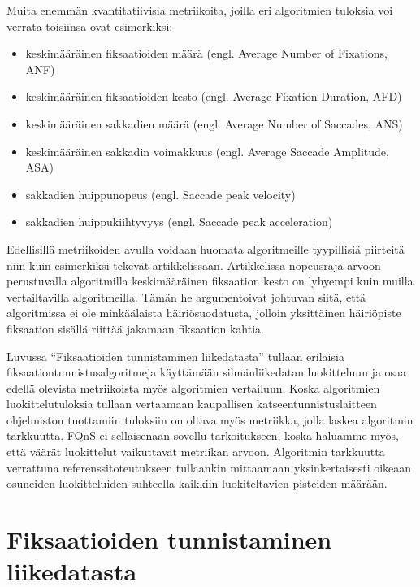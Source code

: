 Muita enemmän kvantitatiivisia metriikoita, joilla eri algoritmien tuloksia voi verrata toisiinsa ovat esimerkiksi:
\begin{itemize}
  \item keskimääräinen fiksaatioiden määrä (engl. Average Number of Fixations, ANF) \citep[s. 4]{komogortsev2010}
  \item keskimääräinen fiksaatioiden kesto (engl. Average Fixation Duration, AFD) \citep[s. 4]{komogortsev2010}
  \item keskimääräinen sakkadien määrä (engl. Average Number of Saccades, ANS) \citep[s. 4]{komogortsev2010}
	\item keskimääräinen sakkadin voimakkuus (engl. Average Saccade Amplitude, ASA) \citep[s. 4]{komogortsev2010}
	\item sakkadien huippunopeus (engl. Saccade peak velocity) \citep[s. 195]{nystrom2010}
	\item sakkadien huippukiihtyvyys (engl. Saccade peak acceleration) \citep[s. 195]{nystrom2010}
	
\end{itemize}

Edellisillä metriikoiden avulla voidaan huomata algoritmeille tyypillisiä piirteitä niin kuin esimerkiksi \citet[s. 195]{nystrom2010} tekevät artikkelissaan. Artikkelissa nopeusraja-arvoon perustuvalla algoritmilla keskimääräinen fiksaation kesto on lyhyempi kuin muilla vertailtavilla algoritmeilla. Tämän he argumentoivat johtuvan siitä, että algoritmissa ei ole minkäälaista häiriösuodatusta, jolloin yksittäinen häiriöpiste fiksaation sisällä riittää jakamaan fiksaation kahtia.

Luvussa ``Fiksaatioiden tunnistaminen liikedatasta'' tullaan erilaisia fiksaationtunnistusalgoritmeja käyttämään silmänliikedatan luokitteluun ja osaa edellä olevista metriikoista myös algoritmien vertailuun. Koska algoritmien luokittelutuloksia tullaan vertaamaan kaupallisen katseentunnistuslaitteen ohjelmiston tuottamiin tuloksiin on oltava myös metriikka, jolla laskea algoritmin tarkkuutta. FQnS ei sellaisenaan sovellu tarkoitukseen, koska haluamme myös, että väärät luokittelut vaikuttavat metriikan arvoon. Algoritmin  tarkkuutta verrattuna referenssitoteutukseen tullaankin mittaamaan yksinkertaisesti oikeaan osuneiden luokitteluiden suhteella kaikkiin luokiteltavien pisteiden määrään.




\section{Fiksaatioiden tunnistaminen liikedatasta}

